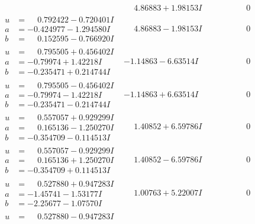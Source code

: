 \documentclass[1p]{elsarticle_modified}
\theoremstyle{definition}
\begin{document}
$$\begin{array}{c|c|c}
 & \phantom{-}4.86883 + 1.98153 I & \phantom{-0.000000 } 0 \\ \hline\begin{aligned}
u &= \phantom{-}0.792422 - 0.720401 I \\
a &= -0.424977 - 1.294580 I \\
b &= \phantom{-}0.152595 - 0.766920 I\end{aligned}
 & \phantom{-}4.86883 - 1.98153 I & \phantom{-0.000000 } 0 \\ \hline\begin{aligned}
u &= \phantom{-}0.795505 + 0.456402 I \\
a &= -0.79974 + 1.42218 I \\
b &= -0.235471 + 0.214744 I\end{aligned}
 & -1.14863 - 6.63514 I & \phantom{-0.000000 } 0 \\ \hline\begin{aligned}
u &= \phantom{-}0.795505 - 0.456402 I \\
a &= -0.79974 - 1.42218 I \\
b &= -0.235471 - 0.214744 I\end{aligned}
 & -1.14863 + 6.63514 I & \phantom{-0.000000 } 0 \\ \hline\begin{aligned}
u &= \phantom{-}0.557057 + 0.929299 I \\
a &= \phantom{-}0.165136 - 1.250270 I \\
b &= -0.354709 - 0.114513 I\end{aligned}
 & \phantom{-}1.40852 + 6.59786 I & \phantom{-0.000000 } 0 \\ \hline\begin{aligned}
u &= \phantom{-}0.557057 - 0.929299 I \\
a &= \phantom{-}0.165136 + 1.250270 I \\
b &= -0.354709 + 0.114513 I\end{aligned}
 & \phantom{-}1.40852 - 6.59786 I & \phantom{-0.000000 } 0 \\ \hline\begin{aligned}
u &= \phantom{-}0.527880 + 0.947283 I \\
a &= -1.45741 - 1.53177 I \\
b &= -2.25677 - 1.07570 I\end{aligned}
 & \phantom{-}1.00763 + 5.22007 I & \phantom{-0.000000 } 0 \\ \hline\begin{aligned}
u &= \phantom{-}0.527880 - 0.947283 I \\

\end{aligned}
\end{array}$$
\end{document}
